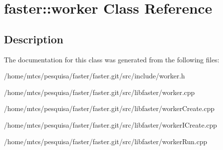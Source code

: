 \hypertarget{classfaster_1_1worker}{}\section{faster\+:\+:worker Class Reference}
\label{classfaster_1_1worker}


\subsection{Description}


The documentation for this class was generated from the following files\+:\begin{DoxyCompactItemize}
\item 
/home/mtcs/pesquisa/faster/faster.\+git/src/include/worker.\+h\item 
/home/mtcs/pesquisa/faster/faster.\+git/src/libfaster/worker.\+cpp\item 
/home/mtcs/pesquisa/faster/faster.\+git/src/libfaster/worker\+Create.\+cpp\item 
/home/mtcs/pesquisa/faster/faster.\+git/src/libfaster/worker\+I\+Create.\+cpp\item 
/home/mtcs/pesquisa/faster/faster.\+git/src/libfaster/worker\+Run.\+cpp\end{DoxyCompactItemize}
